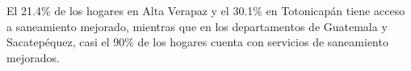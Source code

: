 El 21.4\% de los hogares en Alta Verapaz y el 30.1\% en Totonicapán tiene acceso a saneamiento mejorado, mientras que en los departamentos de Guatemala y Sacatepéquez, casi el 90\% de los hogares cuenta con servicios de saneamiento mejorados.